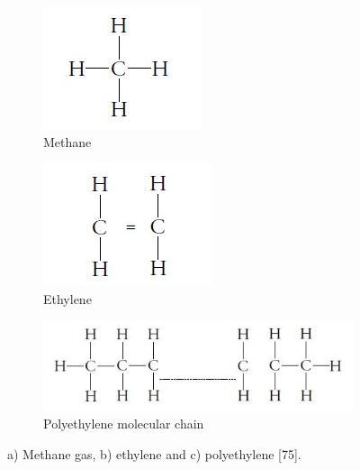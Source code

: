 \documentclass[12pt]{report}
\begin{document}
\begin{figure}[H]
\centering

\begin{subfigure}{.3\textwidth}
    \centering
    \includegraphics[width=\textwidth]{methane_molecular_chain.jpg}
    \caption{Methane}
\end{subfigure}
\begin{subfigure}{.3\textwidth}
    \centering
    \includegraphics[width=\textwidth]{ethylene_molecular_chain.jpg}
    \caption{Ethylene}
\end{subfigure}
\begin{subfigure}{.65\textwidth}
    \centering
    \includegraphics[width=\textwidth]{polythylene_molecular_chain.jpg}
    \caption{Polyethylene molecular chain}
\end{subfigure}

\caption{a) Methane gas, b) ethylene and c) polyethylene [75].}
\label{ch3:figure:molecular_chains}
\end{figure}
\end{document}
